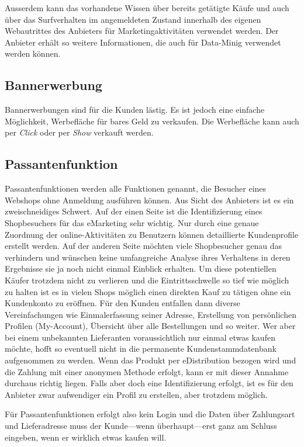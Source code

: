 Ausserdem kann das vorhandene Wissen über bereits getätigte Käufe und auch
über das Surfverhalten im angemeldeten Zustand innerhalb des eigenen
Webautrittes des Anbieters für Marketingaktivitäten verwendet werden.
Der Anbieter erhält so weitere Informationen, die auch für Data-Minig
verwendet werden können.

\subsection{Bannerwerbung}

Bannerwerbungen sind für die Kunden lästig. Es ist jedoch eine einfache
Möglichkeit, Werbefläche für bares Geld zu verkaufen. Die Werbefläche kann
auch per \emph{Click} oder per \emph{Show} verkauft werden.

\subsection{Passantenfunktion}

Passantenfunktionen werden alle Funktionen genannt, die Besucher eines
Webshops ohne Anmeldung ausführen können. Aus Sicht des Anbieters ist
es ein zweischneidiges Schwert. Auf der einen Seite ist die Identifizierung
eines Shopbesuchers für das eMarketing sehr wichtig. Nur durch eine genaue
Zuordnung der online-Aktivitäten zu Benutzern können detaillierte Kundenprofile
erstellt werden. Auf der anderen Seite möchten viele Shopbesucher genau
das verhindern und wünschen keine umfangreiche Analyse ihres Verhaltens
in deren Ergebnisse sie ja noch nicht einmal Einblick erhalten. Um diese
potentiellen Käufer trotzdem nicht zu verlieren und die Eintrittsschwelle
so tief wie möglich zu halten ist es in vielen Shops möglich einen direkten
Kauf zu tätigen ohne ein Kundenkonto zu eröffnen. Für den Kunden entfallen
dann diverse Vereinfachungen wie Einmalerfassung seiner Adresse, Erstellung
von persönlichen Profilen (My-Account), Übersicht über alle Bestellungen
und so weiter. Wer aber bei einem unbekannten Lieferanten voraussichtlich
nur einmal etwas kaufen möchte, hofft so eventuell nicht in die permanente
Kundenstammdatenbank aufgenommen zu werden. Wenn das Produkt per eDistribution
bezogen wird und die Zahlung mit einer anonymen Methode erfolgt, kann er
mit dieser Annahme durchaus richtig liegen. Falls aber doch eine Identifizierung
erfolgt, ist es für den Anbieter zwar aufwendiger ein Profil zu erstellen,
aber trotzdem möglich.

Für Passantenfunktionen erfolgt also kein Login und die Daten über Zahlungsart
und Lieferadresse muss der Kunde---wenn überhaupt---erst ganz am Schluss
eingeben, wenn er wirklich etwas kaufen will.


